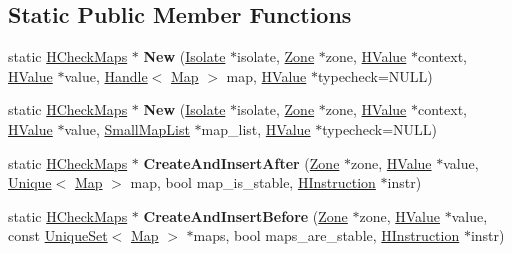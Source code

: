 \subsection*{Static Public Member Functions}
\begin{DoxyCompactItemize}
\item 
static \hyperlink{classv8_1_1internal_1_1_h_check_maps}{H\+Check\+Maps} $\ast$ {\bfseries New} (\hyperlink{classv8_1_1internal_1_1_isolate}{Isolate} $\ast$isolate, \hyperlink{classv8_1_1internal_1_1_zone}{Zone} $\ast$zone, \hyperlink{classv8_1_1internal_1_1_h_value}{H\+Value} $\ast$context, \hyperlink{classv8_1_1internal_1_1_h_value}{H\+Value} $\ast$value, \hyperlink{classv8_1_1internal_1_1_handle}{Handle}$<$ \hyperlink{classv8_1_1internal_1_1_map}{Map} $>$ map, \hyperlink{classv8_1_1internal_1_1_h_value}{H\+Value} $\ast$typecheck=N\+U\+LL)\hypertarget{classv8_1_1internal_1_1_h_check_maps_abca9f4bcb1ccca5288aadef2b26973ef}{}\label{classv8_1_1internal_1_1_h_check_maps_abca9f4bcb1ccca5288aadef2b26973ef}

\item 
static \hyperlink{classv8_1_1internal_1_1_h_check_maps}{H\+Check\+Maps} $\ast$ {\bfseries New} (\hyperlink{classv8_1_1internal_1_1_isolate}{Isolate} $\ast$isolate, \hyperlink{classv8_1_1internal_1_1_zone}{Zone} $\ast$zone, \hyperlink{classv8_1_1internal_1_1_h_value}{H\+Value} $\ast$context, \hyperlink{classv8_1_1internal_1_1_h_value}{H\+Value} $\ast$value, \hyperlink{classv8_1_1internal_1_1_small_map_list}{Small\+Map\+List} $\ast$map\+\_\+list, \hyperlink{classv8_1_1internal_1_1_h_value}{H\+Value} $\ast$typecheck=N\+U\+LL)\hypertarget{classv8_1_1internal_1_1_h_check_maps_ab2c41e7589365b6f6fc94c87c62d4376}{}\label{classv8_1_1internal_1_1_h_check_maps_ab2c41e7589365b6f6fc94c87c62d4376}

\item 
static \hyperlink{classv8_1_1internal_1_1_h_check_maps}{H\+Check\+Maps} $\ast$ {\bfseries Create\+And\+Insert\+After} (\hyperlink{classv8_1_1internal_1_1_zone}{Zone} $\ast$zone, \hyperlink{classv8_1_1internal_1_1_h_value}{H\+Value} $\ast$value, \hyperlink{classv8_1_1internal_1_1_unique}{Unique}$<$ \hyperlink{classv8_1_1internal_1_1_map}{Map} $>$ map, bool map\+\_\+is\+\_\+stable, \hyperlink{classv8_1_1internal_1_1_h_instruction}{H\+Instruction} $\ast$instr)\hypertarget{classv8_1_1internal_1_1_h_check_maps_aa0d872282ed47df347cb0cd93508ed11}{}\label{classv8_1_1internal_1_1_h_check_maps_aa0d872282ed47df347cb0cd93508ed11}

\item 
static \hyperlink{classv8_1_1internal_1_1_h_check_maps}{H\+Check\+Maps} $\ast$ {\bfseries Create\+And\+Insert\+Before} (\hyperlink{classv8_1_1internal_1_1_zone}{Zone} $\ast$zone, \hyperlink{classv8_1_1internal_1_1_h_value}{H\+Value} $\ast$value, const \hyperlink{classv8_1_1internal_1_1_unique_set}{Unique\+Set}$<$ \hyperlink{classv8_1_1internal_1_1_map}{Map} $>$ $\ast$maps, bool maps\+\_\+are\+\_\+stable, \hyperlink{classv8_1_1internal_1_1_h_instruction}{H\+Instruction} $\ast$instr)\hypertarget{classv8_1_1internal_1_1_h_check_maps_af49b5eb7178610a5a7f746271e706331}{}\label{classv8_1_1internal_1_1_h_check_maps_af49b5eb7178610a5a7f746271e706331}

\end{DoxyCompactItemize}
